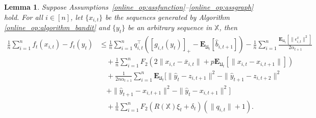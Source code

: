 \documentclass[12pt,draftcls,onecolumn]{IEEEtran}%
\newtheorem{lemma}{Lemma}
\begin{document}
\begin{lemma}\label{online_op:lemma_regretdelta_bandit}
Suppose Assumptions~\ref{online_op:assfunction}--\ref{online_op:assgraph} hold. For all $i\in[n]$, let $\{x_{i,t}\}$ be the sequences generated by Algorithm \ref{online_op:algorithm_bandit} and $\{y_{t}\}$ be an arbitrary sequence in $\mathbb{X}$, then
\begin{align}\label{online_op:lemma_regretdeltaequ_bandit}
\frac{1}{n}\sum_{i=1}^nf_{t}(x_{i,t})
-f_{t}(y_t)
&\le \frac{1}{n}\sum_{i=1}^nq_{i,t}^\top ([g_{i,t}(y_{t})]_+-\mathbf{E}_{\mathfrak{U}_{t}}[\hat{b}_{i,t+1}])
-\frac{1}{n}\sum_{i=1}^n\frac{\mathbf{E}_{\mathfrak{U}_{t}}[\|\epsilon^x_{i,t}\|^2]}{2\alpha_{t+1}}
\nonumber\\
&\quad+\frac{1}{n}\sum_{i=1}^nF_2(2\|x_{i,t}-\bar{x}_{i,t}\|
+p\mathbf{E}_{\mathfrak{U}_{t}}[\|x_{i,t}-x_{i,t+1}\|])\nonumber\\
&\quad+\frac{1}{ 2n\alpha_{t+1}}\sum_{i=1}^n\mathbf{E}_{\mathfrak{U}_{t}}[\|\hat{y}_t-z_{i,t+1}\|^2
-\|\hat{y}_{t+1}-z_{i,t+2}\|^2\nonumber\\
&\quad+\|\hat{y}_{t+1}-x_{i,t+1}\|^2-\|\hat{y}_t-x_{i,t+1}\|^2]\nonumber\\
&\quad+\frac{1}{n}\sum_{i=1}^nF_2(R(\mathbb{X})\xi_{t}+ \delta_{t})(\|q_{i,t}\|+1).
\end{align}
\end{lemma}
\end{document}
